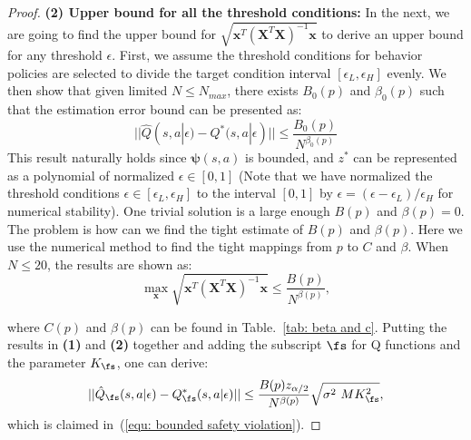 \begin{proof}
\textbf{(2) Upper bound for all the threshold conditions:} In the next, we are going to find the upper bound for $\sqrt{\boldsymbol{x}^T (\boldsymbol{X}^T \boldsymbol{X})^{-1} \boldsymbol{x}}$ to derive an upper bound for any threshold $\epsilon$. First, we assume the threshold conditions for behavior policies are selected to divide the target condition interval $[\epsilon_L, \epsilon_H]$ evenly. We then show that given limited $N \leq N_{max}$, there exists $B_0(p)$ and $\beta_0(p)$ such that the estimation error bound can be presented as:
\begin{equation}
\label{equ: representation assumption}
    ||\hat{Q}(s, a|\epsilon) - Q^*(s, a|\epsilon)|| \leq \frac{B_0(p)}{N^{\beta_0(p)}}
\end{equation}
This result naturally holds since $\boldsymbol{\psi}(s, a)$ is bounded, and $z^*$ can be represented as a polynomial of normalized $\epsilon \in [0, 1]$ (Note that we have normalized the threshold conditions $\epsilon \in [\epsilon_L, \epsilon_H]$ to the interval $[0, 1]$ by $\epsilon = (\epsilon - \epsilon_L) / \epsilon_H$ for numerical stability). One trivial solution is a large enough $B(p)$ and $\beta(p)=0$. The problem is how can we find the tight estimate of $B(p)$ and $\beta(p)$. Here we use the numerical method to find the tight mappings from $p$ to $C$ and $\beta$. When $N \leq 20$, the results are shown as:
\begin{equation}
   \max_{\boldsymbol{x}} \sqrt{\boldsymbol{x}^T (\boldsymbol{X}^T \boldsymbol{X})^{-1} \boldsymbol{x} } \leq \frac{B(p)}{N^{\beta(p)}},
\end{equation}

where $C(p)$ and $\beta(p)$ can be found in Table.~\ref{tab: beta and c}. Putting the results in \textbf{(1)} and \textbf{(2)} together and adding the subscript $\fs$ for Q functions and the parameter $K_\fs$, one can derive:
\begin{equation}
\label{equ: results for bounded error}
    ||\hat{Q}_\fs(s, a|\epsilon) - Q_\fs^*(s, a|\epsilon)|| \leq \frac{B(p) z_{\alpha/2}}{N^{\beta(p)}} \sqrt{ \sigma^2 \ M K_\fs^2},
\end{equation}
which is claimed in~(\ref{equ: bounded safety violation}).
\end{proof}
